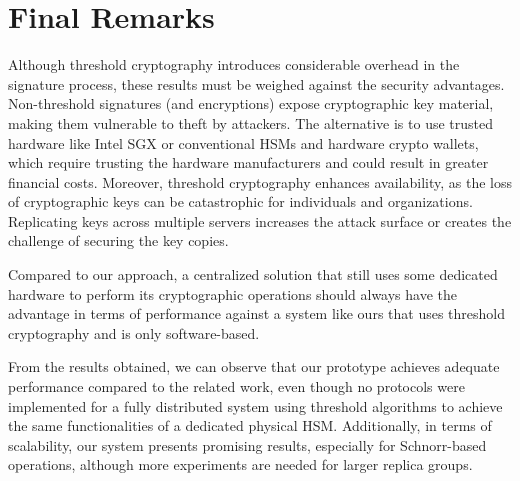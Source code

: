 \section{Final Remarks} \label{sec:eval-final-remarks}

Although threshold cryptography introduces considerable overhead in the signature process, these results must be weighed against the security advantages. Non-threshold signatures (and encryptions) expose cryptographic key material, making them vulnerable to theft by attackers. The alternative is to use trusted hardware like Intel SGX or conventional HSMs and hardware crypto wallets, which require trusting the hardware manufacturers and could result in greater financial costs. Moreover, threshold cryptography enhances availability, as the loss of cryptographic keys can be catastrophic for individuals and organizations. Replicating keys across multiple servers increases the attack surface or creates the challenge of securing the key copies.

Compared to our approach, a centralized solution that still uses some dedicated hardware to perform its cryptographic operations should always have the advantage in terms of performance against a system like ours that uses threshold cryptography and is only software-based.


From the results obtained, we can observe that our prototype achieves adequate performance compared to the related work, even though no protocols were implemented for a fully distributed system using threshold algorithms to achieve the same functionalities of a dedicated physical HSM. Additionally, in terms of scalability, our system presents promising results, especially for Schnorr-based operations, although more experiments are needed for larger replica groups.



\LIMPA